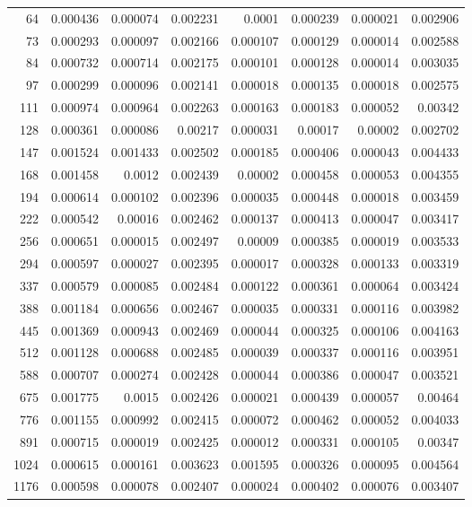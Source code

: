 \begin{longtable}{r r r r r r r r}
64 & 0.000436 & 0.000074 & 0.002231 & 0.0001 & 0.000239 & 0.000021 & 0.002906 \\
73 & 0.000293 & 0.000097 & 0.002166 & 0.000107 & 0.000129 & 0.000014 & 0.002588 \\
84 & 0.000732 & 0.000714 & 0.002175 & 0.000101 & 0.000128 & 0.000014 & 0.003035 \\
97 & 0.000299 & 0.000096 & 0.002141 & 0.000018 & 0.000135 & 0.000018 & 0.002575 \\
111 & 0.000974 & 0.000964 & 0.002263 & 0.000163 & 0.000183 & 0.000052 & 0.00342 \\
128 & 0.000361 & 0.000086 & 0.00217 & 0.000031 & 0.00017 & 0.00002 & 0.002702 \\
147 & 0.001524 & 0.001433 & 0.002502 & 0.000185 & 0.000406 & 0.000043 & 0.004433 \\
168 & 0.001458 & 0.0012 & 0.002439 & 0.00002 & 0.000458 & 0.000053 & 0.004355 \\
194 & 0.000614 & 0.000102 & 0.002396 & 0.000035 & 0.000448 & 0.000018 & 0.003459 \\
222 & 0.000542 & 0.00016 & 0.002462 & 0.000137 & 0.000413 & 0.000047 & 0.003417 \\
256 & 0.000651 & 0.000015 & 0.002497 & 0.00009 & 0.000385 & 0.000019 & 0.003533 \\
294 & 0.000597 & 0.000027 & 0.002395 & 0.000017 & 0.000328 & 0.000133 & 0.003319 \\
337 & 0.000579 & 0.000085 & 0.002484 & 0.000122 & 0.000361 & 0.000064 & 0.003424 \\
388 & 0.001184 & 0.000656 & 0.002467 & 0.000035 & 0.000331 & 0.000116 & 0.003982 \\
445 & 0.001369 & 0.000943 & 0.002469 & 0.000044 & 0.000325 & 0.000106 & 0.004163 \\
512 & 0.001128 & 0.000688 & 0.002485 & 0.000039 & 0.000337 & 0.000116 & 0.003951 \\
588 & 0.000707 & 0.000274 & 0.002428 & 0.000044 & 0.000386 & 0.000047 & 0.003521 \\
675 & 0.001775 & 0.0015 & 0.002426 & 0.000021 & 0.000439 & 0.000057 & 0.00464 \\
776 & 0.001155 & 0.000992 & 0.002415 & 0.000072 & 0.000462 & 0.000052 & 0.004033 \\
891 & 0.000715 & 0.000019 & 0.002425 & 0.000012 & 0.000331 & 0.000105 & 0.00347 \\
1024 & 0.000615 & 0.000161 & 0.003623 & 0.001595 & 0.000326 & 0.000095 & 0.004564 \\
1176 & 0.000598 & 0.000078 & 0.002407 & 0.000024 & 0.000402 & 0.000076 & 0.003407 \\

\end{longtable}

